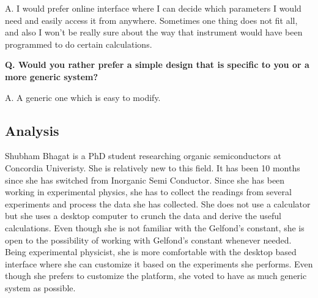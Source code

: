 \documentclass{article}
\begin{document}
A. I would prefer online interface where I can decide which parameters I would need and easily access it from anywhere. Sometimes one thing does not fit all, and also I won’t be really sure about the way that instrument would have been programmed to do certain calculations.
\vspace{0.6em}

\textbf{Q. Would you rather prefer a simple design that is specific to you or a more generic system?}

A. A generic one which is easy to modify.

\subsection{Analysis}
\justifying
Shubham Bhagat is a PhD student researching organic semiconductors at Concordia Univeristy. She is relatively new to this field. It has been 10 months since she has switched from Inorganic Semi Conductor. Since she has been working in experimental physics, she has to collect the readings from several experiments and process the data she has collected. She does not use a calculator but she uses a desktop computer to crunch the data and derive the useful calculations. Even though she is not familiar with the Gelfond's constant, she is open to the possibility of working with Gelfond's constant whenever needed. Being experimental physicist, she is more comfortable with the desktop based interface where she can customize it based on the experiments she performs. Even though she prefers to customize the platform, she voted to have as much generic system as possible.

\clearpage

\end{document}
